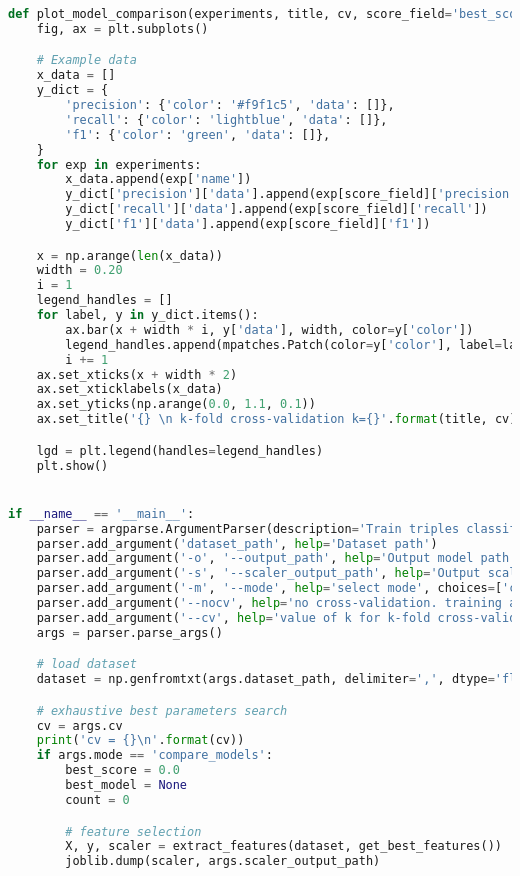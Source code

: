 \begin{lstlisting}[language=Python]
def plot_model_comparison(experiments, title, cv, score_field='best_score'):
    fig, ax = plt.subplots()

    # Example data
    x_data = []
    y_dict = {
        'precision': {'color': '#f9f1c5', 'data': []},
        'recall': {'color': 'lightblue', 'data': []},
        'f1': {'color': 'green', 'data': []},
    }
    for exp in experiments:
        x_data.append(exp['name'])
        y_dict['precision']['data'].append(exp[score_field]['precision'])
        y_dict['recall']['data'].append(exp[score_field]['recall'])
        y_dict['f1']['data'].append(exp[score_field]['f1'])

    x = np.arange(len(x_data))
    width = 0.20
    i = 1
    legend_handles = []
    for label, y in y_dict.items():
        ax.bar(x + width * i, y['data'], width, color=y['color'])
        legend_handles.append(mpatches.Patch(color=y['color'], label=label))
        i += 1
    ax.set_xticks(x + width * 2)
    ax.set_xticklabels(x_data)
    ax.set_yticks(np.arange(0.0, 1.1, 0.1))
    ax.set_title('{} \n k-fold cross-validation k={}'.format(title, cv))

    lgd = plt.legend(handles=legend_handles)
    plt.show()


if __name__ == '__main__':
    parser = argparse.ArgumentParser(description='Train triples classifier')
    parser.add_argument('dataset_path', help='Dataset path')
    parser.add_argument('-o', '--output_path', help='Output model path', default='triples-classifier-model.pkl')
    parser.add_argument('-s', '--scaler_output_path', help='Output scaler path', default='triples-classifier-scaler.pkl')
    parser.add_argument('-m', '--mode', help='select mode', choices=['compare_models', 'compare_features', 'train_model'], default='train_model')
    parser.add_argument('--nocv', help='no cross-validation. training accuracy only', action='store_true')
    parser.add_argument('--cv', help='value of k for k-fold cross-validation', type=int, default=3)
    args = parser.parse_args()

    # load dataset
    dataset = np.genfromtxt(args.dataset_path, delimiter=',', dtype='float32')

    # exhaustive best parameters search
    cv = args.cv
    print('cv = {}\n'.format(cv))
    if args.mode == 'compare_models':
        best_score = 0.0
        best_model = None
        count = 0

        # feature selection
        X, y, scaler = extract_features(dataset, get_best_features())
        joblib.dump(scaler, args.scaler_output_path)


\end{lstlisting}
